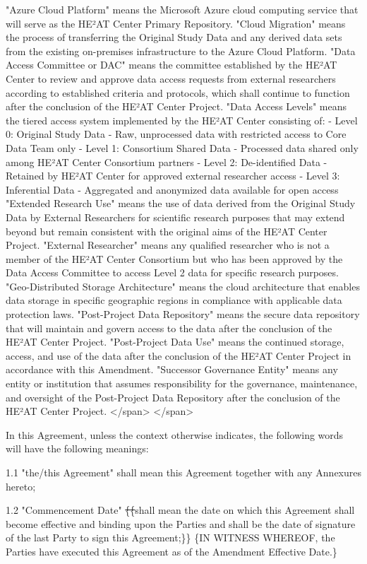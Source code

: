\documentclass[12pt,letterpaper]{article}
\newcommand{\deleted}[1]{\textcolor{deletecolor}{\sout{#1}}}
\newcommand{\added}[1]{\textcolor{addcolor}{#1}}
\begin{document}
"Azure Cloud Platform" means the Microsoft Azure cloud computing service that will serve as the HE²AT Center Primary Repository. "Cloud Migration" means the process of transferring the Original Study Data and any derived data sets from the existing on-premises infrastructure to the Azure Cloud Platform. "Data Access Committee or DAC" means the committee established by the HE²AT Center to review and approve data access requests from external researchers according to established criteria and protocols, which shall continue to function after the conclusion of the HE²AT Center Project. "Data Access Levels" means the tiered access system implemented by the HE²AT Center consisting of: - Level 0: Original Study Data - Raw, unprocessed data with restricted access to Core Data Team only - Level 1: Consortium Shared Data - Processed data shared only among HE²AT Center Consortium partners - Level 2: De-identified Data - Retained by HE²AT Center for approved external researcher access - Level 3: Inferential Data - Aggregated and anonymized data available for open access "Extended Research Use" means the use of data derived from the Original Study Data by External Researchers for scientific research purposes that may extend beyond but remain consistent with the original aims of the HE²AT Center Project. "External Researcher" means any qualified researcher who is not a member of the HE²AT Center Consortium but who has been approved by the Data Access Committee to access Level 2 data for specific research purposes. "Geo-Distributed Storage Architecture" means the cloud architecture that enables data storage in specific geographic regions in compliance with applicable data protection laws. "Post-Project Data Repository" means the secure data repository that will maintain and govern access to the data after the conclusion of the HE²AT Center Project. "Post-Project Data Use" means the continued storage, access, and use of the data after the conclusion of the HE²AT Center Project in accordance with this Amendment. "Successor Governance Entity" means any entity or institution that assumes responsibility for the governance, maintenance, and oversight of the Post-Project Data Repository after the conclusion of the HE²AT Center Project. </span> </span>

In this Agreement, unless the context otherwise indicates, the following words will have the following meanings:

1.1	"the/this Agreement" shall mean this Agreement together with any Annexures hereto;

1.2	"Commencement Date" \deleted\{\deleted\{shall mean the date on which this Agreement shall become effective and binding upon the Parties and shall be the date of signature of the last Party to sign this Agreement;\}\} \added\{IN WITNESS WHEREOF, the Parties have executed this Agreement as of the Amendment Effective Date.\}
\end{document}
